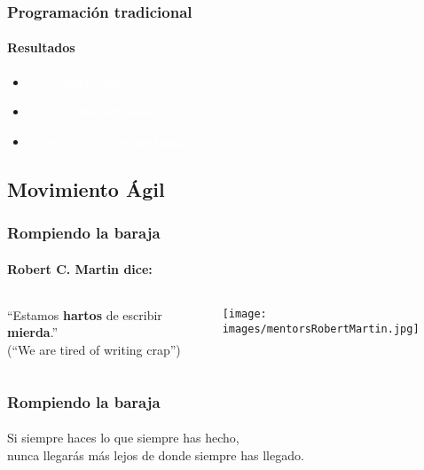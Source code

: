    {

   \begin{frame}
    \frametitle{Programación tradicional}
    \framesubtitle{Resultados}

    \begin{itemize}
     \item \textcolor{white}{Jefes \textbf{cabreados}.}
     \item  \textcolor{white}{Clientes \textbf{descontentos}.}
     \item  \textcolor{white}{Programadores \textbf{desmotivados}.}
    \end{itemize}
   \end{frame}
   }

  \subsection{Movimiento Ágil}


  \begin{frame}
   \frametitle{Rompiendo la baraja}
   \framesubtitle{Robert C. Martin dice:}

   \begin{columns}
    \begin{column}{7cm}
     \begin{center}
    ``Estamos \textbf{hartos} de escribir \textbf{mierda}.''\\[3pc]
    (``We are tired of writing crap'')
     \end{center}
    \end{column}
    \begin{column}{4cm}
      \texttt{[image: images/mentorsRobertMartin.jpg]}
    \end{column}
   \end{columns}
  \end{frame}


  \begin{frame}
   \frametitle{Rompiendo la baraja}
   \framesubtitle{}

   Si siempre haces lo que siempre has hecho,\\
   nunca llegarás más lejos de donde siempre has llegado.

  \end{frame}



